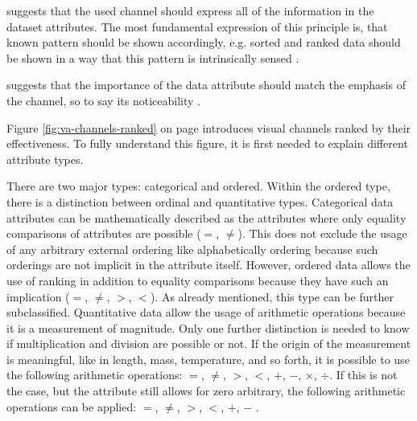 \begin{enumerate}
 suggests that the used channel should express all of the information in the dataset attributes. The most fundamental expression of this principle is, that known pattern should be shown accordingly, e.g. sorted and ranked data should be shown in a way that this pattern is intrinsically sensed .

 suggests that the importance of the data attribute should match the emphasis of the channel, so to say its noticeability .
\end{enumerate}

Figure \ref{fig:va-channels-ranked} on page \pageref{fig:va-channels-ranked} introduces visual channels ranked by their effectiveness. To fully understand this figure, it is first needed to explain different attribute types.

There are two major types: categorical and ordered. Within the ordered type, there is a distinction between ordinal and quantitative types. Categorical data attributes can be mathematically described as the attributes where only equality comparisons of attributes are possible ($=$, $\neq$). This does not exclude the usage of any arbitrary external ordering like alphabetically ordering because such orderings are not implicit in the attribute itself. However, ordered data allows the use of ranking in addition to equality comparisons because they have such an implication ($=$, $\neq$, $>$, $<$). As already mentioned, this type can be further subclassified. Quantitative data allow the usage of arithmetic operations because it is a measurement of magnitude. Only one further distinction is needed to know if multiplication and division are possible or not. If the origin of the measurement is meaningful, like in length, mass, temperature, and so forth, it is possible to use the following arithmetic operations: $=$, $\neq$, $>$, $<$, $+$, $-$, $\times$, $\div$. If this is not the case, but the attribute still allows for zero arbitrary, the following arithmetic operations can be applied: $=$, $\neq$, $>$, $<$, $+$, $-$ .

